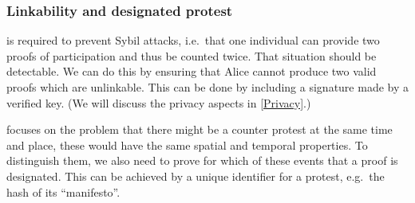 \subsubsection{Linkability and designated protest}

 is required to prevent Sybil attacks, i.e.\ that one 
individual can provide two proofs of participation and thus be counted twice.
That situation should be detectable.
We can do this by ensuring that Alice cannot produce two valid proofs which
are unlinkable.
This can be done by including a signature made by a verified key.
(We will discuss the privacy aspects in \cref{Privacy}.)

 focuses on the problem that there might be a counter 
protest at the same time and place, these would have the same spatial and 
temporal properties.
To distinguish them, we also need to prove for which of these events that a 
proof is designated.
This can be achieved by a unique identifier for a protest, e.g.\ the hash of 
its \enquote{manifesto}.

\begin{frame}
\begin{figure}
  \centering
\end{figure}

\end{frame}

